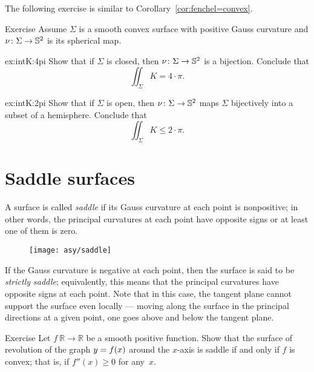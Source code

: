 The following exercise is similar to Corollary~\ref{cor:fenchel=convex}.

\begin{thm}{Exercise}\label{ex:intK}
Assume $\Sigma$ is a smooth convex surface with positive Gauss curvature
and $\nu\colon\Sigma\to \mathbb{S}^2$ is its spherical map.

\begin{multicols}{2}

\begin{subthm}{ex:intK:4pi}
Show that if $\Sigma$ is closed, then $\nu\colon\Sigma\to \mathbb{S}^2$ is a bijection.
Conclude that 
\[\iint_\Sigma K=4\cdot\pi.\]
\end{subthm}

\columnbreak

\begin{subthm}{ex:intK:2pi}
Show that if $\Sigma$ is open, then $\nu\colon\Sigma\to \mathbb{S}^2$
maps $\Sigma$ bijectively into a subset of a hemisphere.
Conclude that 
\[\iint_\Sigma K\le 2\cdot\pi.\]
\end{subthm}

\end{multicols}

\end{thm}


\section{Saddle surfaces}\label{sec:saddle}

A surface is called \emph{saddle} if its Gauss curvature at each point is nonpositive;
in other words, the principal curvatures at each point have opposite signs or at least one of them is zero.

\begin{wrapfigure}{r}{43 mm}
\vskip-0mm
\centering
\texttt{[image: asy/saddle]}
\vskip0mm
\end{wrapfigure}

If the Gauss curvature is negative at each point,
then the surface is said to be {}\emph{strictly saddle};
equivalently, this means that the principal curvatures have opposite signs at each point.
Note that in this case, the tangent plane cannot support the surface even locally --- moving along the surface in the principal directions at a given point, one goes above and below the tangent plane.  


\begin{thm}{Exercise}\label{ex:convex-revolution}
Let $f\:\mathbb{R}\to\mathbb{R}$ be a smooth positive function.
Show that the surface of revolution of the graph $y\z=f(x)$ around the $x$-axis
 is saddle if and only if $f$ is convex; that is, if $f''(x)\ge0$ for any~$x$.
\end{thm}

